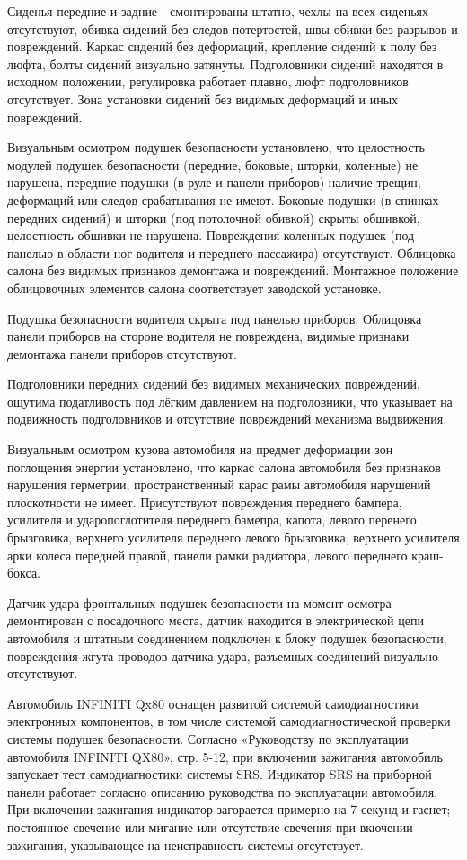 Сиденья передние и задние - смонтированы штатно,  чехлы на всех сиденьях отсутствуют,  обивка сидений без следов потертостей, швы обивки без разрывов и повреждений. Каркас сидений без деформаций, крепление сидений к полу без люфта, болты сидений визуально затянуты. Подголовники сидений находятся в исходном положении, регулировка работает плавно, люфт подголовников отсутствует. Зона установки сидений без видимых деформаций и иных повреждений.


Визуальным осмотром подушек безопасности установлено, что 
целостность модулей подушек безопасности (передние, боковые, шторки, коленные) не нарушена,  передние подушки (в руле и панели приборов) наличие трещин, деформаций или следов срабатывания не имеют. 
Боковые подушки (в спинках передних сидений) и шторки (под потолочной обивкой) скрыты обшивкой,  целостность обшивки не нарушена. Повреждения коленных подушек (под панелью в области ног водителя и переднего пассажира) отсутствуют.   Облицовка салона без видимых признаков демонтажа и повреждений. Монтажное положение облицовочных элементов салона соответствует заводской установке. 

Подушка безопасности водителя скрыта под панелью приборов. Облицовка панели приборов на стороне водителя не повреждена, видимые признаки демонтажа панели приборов отсутствуют.

Подголовники передних сидений без видимых механических повреждений, ощутима податливость под лёгким давлением на подголовники, что указывает на  подвижность подголовников и отсутствие повреждений механизма выдвижения.


Визуальным осмотром кузова автомобиля на предмет деформации зон поглощения энергии установлено, что каркас салона автомобиля без признаков нарушения герметрии, пространственный карас рамы автомобиля нарушений плоскотности не имеет. Присутствуют  повреждения переднего бампера, усилителя и ударопоглотителя переднего бамепра, капота, левого перенего брызговика,  верхнего усилителя  переднего левого брызговика, верхнего усилителя арки колеса передней правой, панели рамки радиатора,  левого переднего краш-бокса.    

Датчик удара  фронтальных подушек безопасности на момент осмотра демонтирован с посадочного места,  датчик находится в электрической цепи автомобиля и штатным соединением  подключен к блоку подушек безопасности,  повреждения  жгута проводов датчика удара, разъемных соединений визуально отсутствуют.


Автомобиль INFINITI Qx80 оснащен развитой системой самодиагностики электронных компонентов, в том числе системой самодиагностической проверки системы подушек безопасности. Согласно «Руководству по эксплуатации автомобиля INFINITI QX80», стр. 5-12, при включении зажигания автомобиль запускает тест самодиагностики системы SRS. Индикатор SRS на приборной панели  работает согласно описанию руководства по эксплуатации автомобиля. При включении зажигания индикатор  загорается примерно на 7 секунд и гаснет; постоянное свечение или мигание или отсутствие свечения при вкючении зажигания, указывающее на неисправность системы отсутствует.

